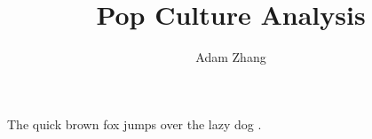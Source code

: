 \documentclass[mla8]{mla}
\title{Pop Culture Analysis}
\author{Adam Zhang}
\date{\mladate}
\begin{document}
\begin{paper}
  The quick brown fox jumps over the lazy dog \autocite{Feuerstin2015:Mansion}.
\end{paper}

\begin{workscited}
  \printbibliography[heading=none]
\end{workscited}
\end{document}
